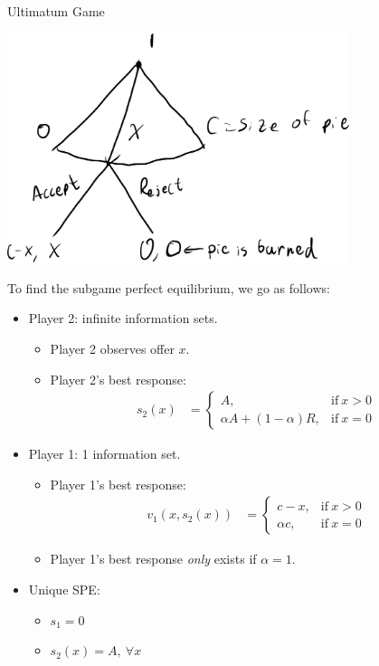 \documentclass[10pt]{extarticle}
\begin{document}
    \begin{problem}{Ultimatum Game}
      \begin{center}
        \includegraphics[width=10cm]{images/ultimatum.png}
      \end{center}
      \tcblower
      To find the subgame perfect equilibrium, we go as follows:
      \begin{itemize}
        \item Player 2: infinite information sets.
          \begin{itemize}
            \item Player 2 observes offer $x$.
            \item Player 2's best response:
              \begin{align*}
                s_2(x) &= \begin{cases}
                  A,&\text{if}~x>0\\
                  \alpha A + (1-\alpha)R,&\text{if}~x=0 \tag*{$\forall \alpha\in[0,1]$}
                \end{cases}
              \end{align*}
          \end{itemize}
        \item Player 1: 1 information set.
          \begin{itemize}
            \item Player 1's best response:
              \begin{align*}
                v_1(x,s_2(x)) &= \begin{cases}
                  c-x,&\text{if}~x>0\\
                  \alpha c,&\text{if}~x=0
                \end{cases}
              \end{align*}
            \item Player 1's best response \textit{only} exists if $\alpha = 1$.
          \end{itemize}
        \item Unique SPE:
          \begin{itemize}
            \item $s_1 = 0$
            \item $s_2(x) = A,~\forall x$
          \end{itemize}
      \end{itemize}
    \end{problem}
\end{document}
